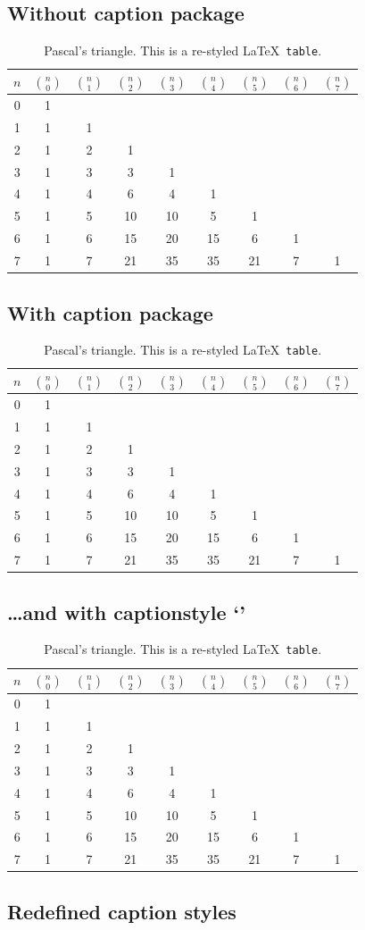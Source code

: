 \documentclass[a4paper]{article}
\makeatletter
\let\x@floatc@plain\floatc@plain
\let\x@fs@boxed\fs@boxed
\let\x@floatc@ruled\floatc@ruled
\let\c@floatc@plain\floatc@plain
\let\c@fs@boxed\fs@boxed
\let\c@floatc@ruled\floatc@ruled
\newcommand*\mycaptionstyle{%
  \captionstyle{indent}%
  \renewcommand\captionfont{\small}%
  \renewcommand\captionlabelfont{\bfseries}%
  \setcaptionmargin{\leftmargini}%
  \setlength\captionindent{\parindent}%
  \renewcommand\captionlabeldelim{.}%
  \onelinecaptionstrue}
\newcommand*\shortcaption[1]{This is a short #1 caption.}
\newcommand*\test[3]{%
  \begin{figure}[!ht]
  \centerline{\uppercase{#1 caption}}
  \caption[This figure sucks]{\label{#2}#3{#1}}
  \end{figure}}
\makeatother
\begin{document}
\newcommand\testboxedfloat{%
\begin{table}[H] \def\B##1{$\displaystyle{n\choose##1}$}
\begin{center} \begin{tabular}{c|cccccccc}
$n$&\B0&\B1&\B2&\B3&\B4&\B5&\B6&\B7\\ \hline
 0 & 1\\
 1 & 1&1\\
 2 & 1&2&1\\
 3 & 1&3&3&1\\
 4 & 1&4&6&4&1\\
 5 & 1&5&10&10&5&1\\
 6 & 1&6&15&20&15&6&1\\
 7 & 1&7&21&35&35&21&7&1
\end{tabular} \end{center}
\caption{Pascal's triangle. This is a re-styled \LaTeX\ \texttt{table}.}
\end{table}}
\newcommand\testfloat{\testplainfloat\testruledfloat\testboxedfloat}

\subsection{Without caption package}
\makeatletter
\let\floatc@plain\x@floatc@plain
\let\fs@boxed\x@fs@boxed
\let\floatc@ruled\x@floatc@ruled
\makeatother
\testfloat

\clearpage
\subsection{With caption package}
\makeatletter
\let\floatc@plain\c@floatc@plain
\let\fs@boxed\c@fs@boxed
\let\floatc@ruled\c@floatc@ruled
\makeatother
\testfloat

\clearpage
\mycaptionstyle
\makeatletter
\subsection{\dots and with captionstyle `\caption@style'}
\makeatother
\testfloat

\clearpage
\subsection{Redefined caption styles}
\end{document}
